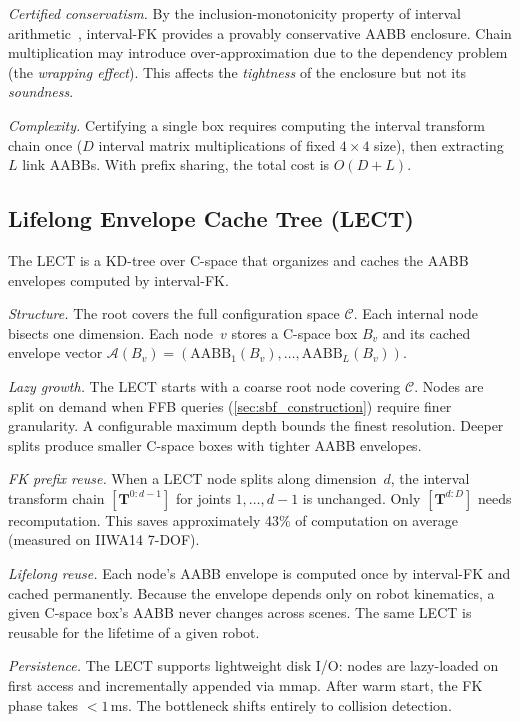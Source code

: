\documentclass[letterpaper, conference]{IEEEtran}
\newcommand{\Cspace}{\mathcal{C}}
\newcommand{\AABB}{\text{AABB}}
\newcommand{\calA}{\mathcal{A}}
\newcommand{\bT}{\mathbf{T}}
\begin{document}
\emph{Certified conservatism.}
By the inclusion-monotonicity property of interval
arithmetic~\cite[Theorem~4.1]{moore2009introduction}, interval-FK provides a
provably conservative AABB enclosure.
Chain multiplication may introduce over-approximation due to the
dependency problem (the \emph{wrapping effect}).
This affects the \emph{tightness} of the enclosure but not its
\emph{soundness}.

\emph{Complexity.}
Certifying a single box requires computing the interval transform
chain once ($D$ interval matrix multiplications of fixed $4{\times}4$
size), then extracting~$L$ link AABBs.
With prefix sharing, the total cost is $O(D + L)$.

\subsection{Lifelong Envelope Cache Tree (LECT)}\label{sec:lect}

The LECT is a KD-tree over C-space that organizes and caches the AABB
envelopes computed by interval-FK.

\emph{Structure.}
The root covers the full configuration space $\Cspace$.
Each internal node bisects one dimension.
Each node~$v$ stores a C-space box $B_v$ and its cached envelope vector
$\calA(B_v) = (\AABB_1(B_v),\ldots,\AABB_L(B_v))$.

\emph{Lazy growth.}
The LECT starts with a coarse root node covering $\Cspace$.
Nodes are split on demand when FFB queries (\cref{sec:sbf_construction})
require finer granularity.
A configurable maximum depth bounds the finest resolution.
Deeper splits produce smaller C-space boxes with tighter AABB envelopes.

\emph{FK prefix reuse.}
When a LECT node splits along dimension~$d$, the interval transform
chain $[\bT^{0:d-1}]$ for joints $1,\ldots,d{-}1$ is unchanged.
Only $[\bT^{d:D}]$ needs recomputation.
This saves approximately 43\% of computation on average (measured on
IIWA14 7-DOF).

\emph{Lifelong reuse.}
Each node's AABB envelope is computed once by interval-FK and cached permanently.
Because the envelope depends only on robot kinematics, a given
C-space box's AABB never changes across scenes.
The same LECT is reusable for the lifetime of a given robot.

\emph{Persistence.}
The LECT supports lightweight disk I/O: nodes are lazy-loaded on first
access and incrementally appended via mmap.
After warm start, the FK phase takes $<\!1$\,ms.
The bottleneck shifts entirely to collision detection.
\end{document}
